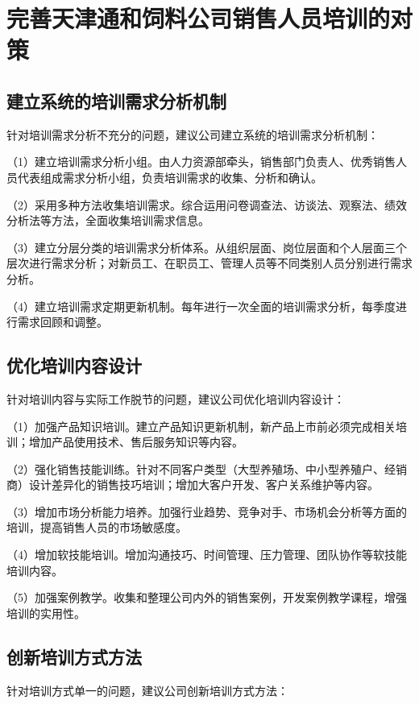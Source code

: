 \section{完善天津通和饲料公司销售人员培训的对策}

\subsection{建立系统的培训需求分析机制}

针对培训需求分析不充分的问题，建议公司建立系统的培训需求分析机制：

（1）建立培训需求分析小组。由人力资源部牵头，销售部门负责人、优秀销售人员代表组成需求分析小组，负责培训需求的收集、分析和确认。

（2）采用多种方法收集培训需求。综合运用问卷调查法、访谈法、观察法、绩效分析法等方法，全面收集培训需求信息。

（3）建立分层分类的培训需求分析体系。从组织层面、岗位层面和个人层面三个层次进行需求分析；对新员工、在职员工、管理人员等不同类别人员分别进行需求分析。

（4）建立培训需求定期更新机制。每年进行一次全面的培训需求分析，每季度进行需求回顾和调整。

\subsection{优化培训内容设计}

针对培训内容与实际工作脱节的问题，建议公司优化培训内容设计：

（1）加强产品知识培训。建立产品知识更新机制，新产品上市前必须完成相关培训；增加产品使用技术、售后服务知识等内容。

（2）强化销售技能训练。针对不同客户类型（大型养殖场、中小型养殖户、经销商）设计差异化的销售技巧培训；增加大客户开发、客户关系维护等内容。

（3）增加市场分析能力培养。加强行业趋势、竞争对手、市场机会分析等方面的培训，提高销售人员的市场敏感度。

（4）增加软技能培训。增加沟通技巧、时间管理、压力管理、团队协作等软技能培训内容。

（5）加强案例教学。收集和整理公司内外的销售案例，开发案例教学课程，增强培训的实用性。

\subsection{创新培训方式方法}

针对培训方式单一的问题，建议公司创新培训方式方法：


